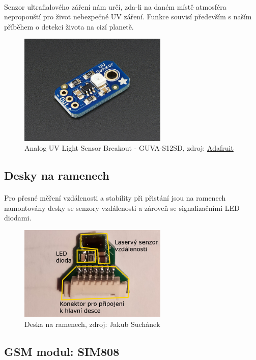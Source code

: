 \documentclass[a4paper]{report}
\begin{document}
\paragraph{} Senzor ultrafialového záření nám určí, zda-li na daném místě atmosféra nepropouští pro život nebezpečné UV záření. Funkce souvisí především s naším příběhem o detekci života na cizí planetě.
\begin{figure}[H]
\caption{Analog UV Light Sensor Breakout - GUVA-S12SD, zdroj: 
\href{https://www.adafruit.com/product/1918}{Adafruit}}
\centering
\includegraphics[width=200pt]{uv_senzor.jpg}
\end{figure}
\subsection{Desky na ramenech}
\paragraph{} Pro přesné měření vzdálenosti a stability při přistání jsou na ramenech namontovány desky se senzory vzdálenosti a zároveň se signalizačními LED diodami.
\begin{figure}[H]
\centering
\caption{Deska na ramenech, zdroj: Jakub Suchánek}
\includegraphics[width=200pt]{deska_rameno.jpg}
\end{figure}
\subsection{GSM modul: SIM808}
\end{document}
